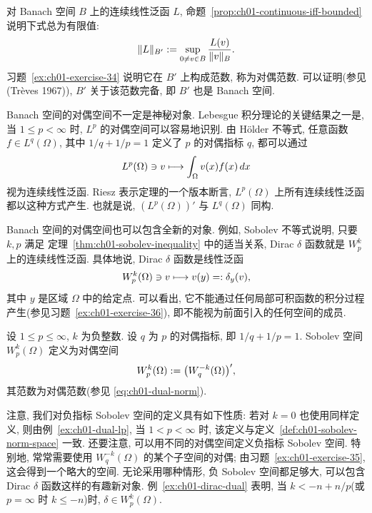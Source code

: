 对 Banach 空间 $B$ 上的连续线性泛函 $L$, 命题~\ref{prop:ch01-continuous-iff-bounded} 说明下式总为有限值:
\setcounter{equation}{1}
\begin{equation}
\MathBookFormulaID{formula-ch01-dual-norm}
\|L\|_{B'}:=\sup_{0\neq v\in B}\frac{L(v)}{\|v\|_B}.
\label{eq:ch01-dual-norm}
\end{equation}
习题~\ref{ex:ch01-exercise-34} 说明它在 $B'$ 上构成范数, 称为对偶范数. 可以证明(参见 (Trèves 1967)), $B'$ 关于该范数完备, 即 $B'$ 也是 Banach 空间.

\setcounter{thmcount}{2}
\begin{Example}
\label{ex:ch01-dual-lp}
Banach 空间的对偶空间不一定是神秘对象. Lebesgue 积分理论的关键结果之一是, 当 $1\leq p<\infty$ 时, $L^p$ 的对偶空间可以容易地识别. 由 Hölder 不等式, 任意函数 $f\in L^q(\Omega)$, 其中 $1/q+1/p=1$ 定义了 $p$ 的对偶指标 $q$, 都可以通过
\[
\MathBookFormulaID{formula-ch01-lp-dual-functional}
L^p(\Omega)\ni v\longmapsto\int_\Omega v(x)f(x)\,dx
\]
视为连续线性泛函. Riesz 表示定理的一个版本断言, $L^p(\Omega)$ 上所有连续线性泛函都以这种方式产生. 也就是说, $(L^p(\Omega))'$ 与 $L^q(\Omega)$ 同构.
\end{Example}

\begin{Example}
\label{ex:ch01-dirac-dual}
Banach 空间的对偶空间也可以包含全新的对象. 例如, Sobolev 不等式说明, 只要 $k,p$ 满足
定理~\ref{thm:ch01-sobolev-inequality} 中的适当关系, Dirac $\delta$ 函数就是 $W_p^k$ 上的连续线性泛函. 具体地说, Dirac $\delta$ 函数是线性泛函
\[
\MathBookFormulaID{formula-ch01-dirac-functional}
W_p^k(\Omega)\ni v\longmapsto v(y)=:\delta_y(v),
\]
其中 $y$ 是区域 $\Omega$ 中的给定点. 可以看出, 它不能通过任何局部可积函数的积分过程产生(参见习题~\ref{ex:ch01-exercise-36}), 即不能视为前面引入的任何空间的成员.
\end{Example}

\begin{Definition}
\label{def:ch01-negative-sobolev-space}
设 $1\leq p\leq\infty$, $k$ 为负整数. 设 $q$ 为 $p$ 的对偶指标, 即 $1/q+1/p=1$. Sobolev 空间 $W_p^k(\Omega)$ 定义为对偶空间
\[
\MathBookFormulaID{formula-ch01-negative-sobolev-space}
W_p^k(\Omega):=\bigl(W_q^{-k}(\Omega)\bigr)',
\]
其范数为对偶范数(参见 \eqref{eq:ch01-dual-norm}).
\end{Definition}

\begin{Remark}
\label{rem:ch01-negative-sobolev-space}
注意, 我们对负指标 Sobolev 空间的定义具有如下性质: 若对 $k=0$ 也使用同样定义, 则由例~\ref{ex:ch01-dual-lp}, 当 $1<p<\infty$ 时, 该定义与定义~\ref{def:ch01-sobolev-norm-space} 一致. 还要注意, 可以用不同的对偶空间定义负指标 Sobolev 空间. 特别地, 常常需要使用 $W_q^{-k}(\Omega)$ 的某个子空间的对偶; 由习题~\ref{ex:ch01-exercise-35}, 这会得到一个略大的空间. 无论采用哪种情形, 负 Sobolev 空间都足够大, 可以包含 Dirac $\delta$ 函数这样的有趣新对象. 例~\ref{ex:ch01-dirac-dual} 表明, 当 $k<-n+n/p$(或 $p=\infty$ 时 $k\leq-n$)时, $\delta\in W_p^k(\Omega)$.
\end{Remark}


